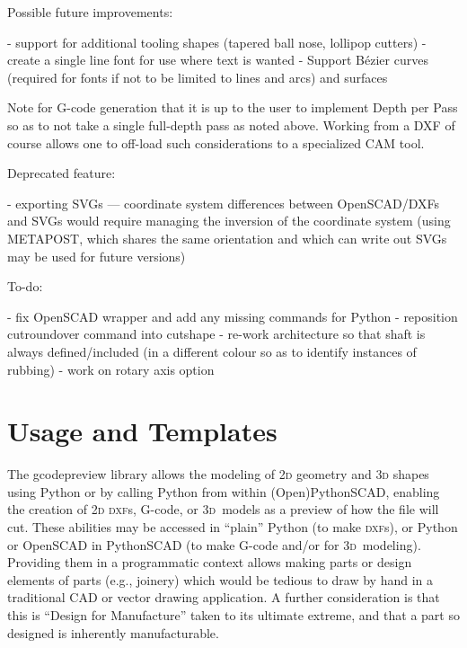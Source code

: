 \documentclass{ltxdoc}
\begin{document}
\begin{readme}
Possible future improvements:

 - support for additional tooling shapes (tapered ball nose, lollipop cutters)
 - create a single line font for use where text is wanted
 - Support Bézier curves (required for fonts if not to be limited to lines and arcs) and surfaces

Note for G-code generation that it is up to the user to implement Depth per Pass so as to not take a single full-depth pass as noted above. Working from a DXF of course allows one to off-load such considerations to a specialized CAM tool.

Deprecated feature:

 - exporting SVGs --- coordinate system differences between OpenSCAD/DXFs and SVGs would require managing the inversion of the coordinate system (using METAPOST, which shares the same orientation and which can write out SVGs may be used for future versions)

To-do:

 -  fix OpenSCAD wrapper and add any missing commands for Python
 -  reposition cutroundover command into cutshape
 -  re-work architecture so that shaft is always defined/included (in a different colour so as to identify instances of rubbing)
 -  work on rotary axis option

\end{readme}


\clearpage

\section{Usage and Templates}

The gcodepreview library allows the modeling of \textsc{2d} geometry and \textsc{3d} shapes using Python or by calling Python from within (Open)PythonSCAD, enabling the creation of \textsc{2d} \textsc{dxf}s, G-code, or \textsc{3d}~models as a preview of how the file will cut. These abilities may be accessed in ``plain'' Python (to make \textsc{dxf}s), or Python or OpenSCAD in PythonSCAD (to make G-code and/or for \textsc{3d}~modeling). Providing them in a programmatic context allows making parts or design elements of parts (e.g., joinery) which would be tedious to draw by hand in a traditional CAD or vector drawing application. A further consideration is that this is ``Design for Manufacture'' taken to its ultimate extreme, and that a part so designed is inherently manufacturable.
\end{document}
